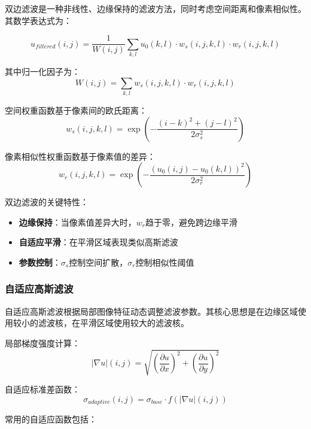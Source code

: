 \documentclass[a4paper,12pt]{ctexart}
\begin{document}
双边滤波是一种非线性、边缘保持的滤波方法，同时考虑空间距离和像素相似性。其数学表达式为：

\begin{equation}
u_{filtered}(i,j) = \frac{1}{W(i,j)} \sum_{k,l} u_0(k,l) \cdot w_s(i,j,k,l) \cdot w_r(i,j,k,l)
\end{equation}

其中归一化因子为：
\begin{equation}
W(i,j) = \sum_{k,l} w_s(i,j,k,l) \cdot w_r(i,j,k,l)
\end{equation}

空间权重函数基于像素间的欧氏距离：
\begin{equation}
w_s(i,j,k,l) = \exp\left(-\frac{(i-k)^2+(j-l)^2}{2\sigma_s^2}\right)
\end{equation}

像素相似性权重函数基于像素值的差异：
\begin{equation}
w_r(i,j,k,l) = \exp\left(-\frac{(u_0(i,j)-u_0(k,l))^2}{2\sigma_r^2}\right)
\end{equation}

双边滤波的关键特性：

\begin{itemize}
    \item \textbf{边缘保持}：当像素值差异大时，$w_r$趋于零，避免跨边缘平滑
    \item \textbf{自适应平滑}：在平滑区域表现类似高斯滤波
    \item \textbf{参数控制}：$\sigma_s$控制空间扩散，$\sigma_r$控制相似性阈值
\end{itemize}

\subsubsection{自适应高斯滤波}

自适应高斯滤波根据局部图像特征动态调整滤波参数。其核心思想是在边缘区域使用较小的滤波核，在平滑区域使用较大的滤波核。

局部梯度强度计算：
\begin{equation}
|\nabla u|(i,j) = \sqrt{\left(\frac{\partial u}{\partial x}\right)^2 + \left(\frac{\partial u}{\partial y}\right)^2}
\end{equation}

自适应标准差函数：
\begin{equation}
\sigma_{adaptive}(i,j) = \sigma_{base} \cdot f(|\nabla u|(i,j))
\end{equation}

常用的自适应函数包括：
\end{document}
